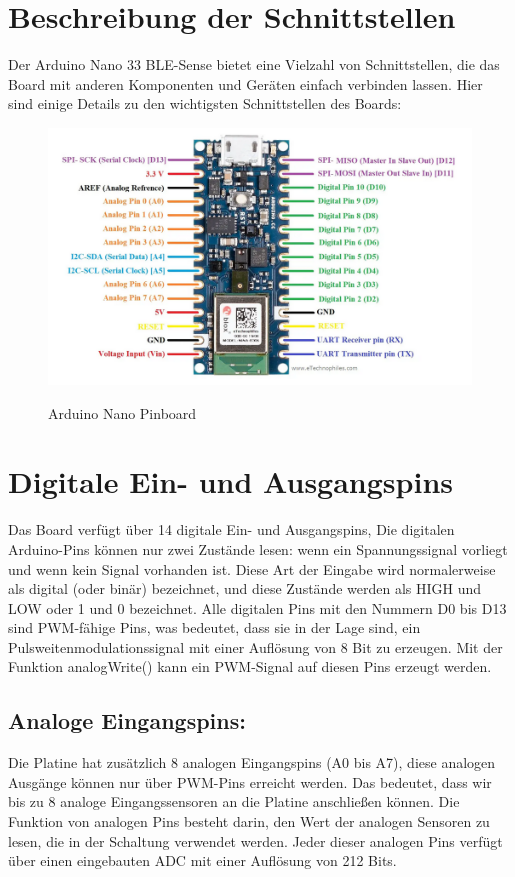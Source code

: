 \section{Beschreibung der Schnittstellen}
Der Arduino Nano 33 BLE-Sense bietet eine Vielzahl von Schnittstellen, die das Board mit anderen Komponenten und Geräten einfach verbinden lassen. Hier sind einige Details zu den wichtigsten Schnittstellen des Boards:
\bigskip
\begin{figure}[htb]
	\includegraphics[width=14cm]{General/ArduinoPinBoard.png}
	\caption{Arduino Nano Pinboard} \label{Arduino Nano Pinbout}\begin{center}
		\cite{Arduino2023}
	\end{center}
\end{figure}
\newpage
\section{Digitale Ein- und Ausgangspins}

Das Board verfügt über 14 digitale Ein- und Ausgangspins, Die digitalen Arduino-Pins können nur zwei Zustände lesen: wenn ein Spannungssignal vorliegt und wenn kein Signal vorhanden ist. Diese Art der Eingabe wird normalerweise als digital (oder binär) bezeichnet, und diese Zustände werden als HIGH und LOW oder 1 und 0 bezeichnet.
Alle digitalen Pins mit den Nummern D0 bis D13 sind PWM-fähige Pins, was bedeutet, dass sie in der Lage sind, ein Pulsweitenmodulationssignal mit einer Auflösung von 8 Bit zu erzeugen. Mit der Funktion analogWrite() kann ein PWM-Signal auf diesen Pins erzeugt werden.\cite{eTech.2021}\cite{ArdSense.2023}

\subsection{Analoge Eingangspins:}
Die Platine hat zusätzlich 8 analogen Eingangspins (A0 bis A7), diese analogen Ausgänge können nur über PWM-Pins erreicht werden. Das bedeutet, dass wir bis zu 8 analoge Eingangssensoren an die Platine anschließen können. Die Funktion von analogen Pins besteht darin, den Wert der analogen Sensoren zu lesen, die in der Schaltung verwendet werden. Jeder dieser analogen Pins verfügt über einen eingebauten ADC mit einer Auflösung von 212 Bits.

